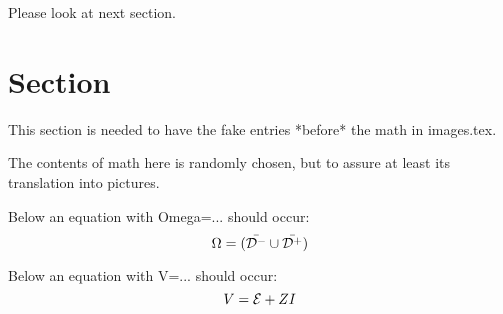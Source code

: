 \documentclass[12pt]{article}
\theoremstyle{plain}
\theoremstyle{break}
\begin{document}
Please look at next section.

\section{Section}
This section is needed to have the fake entries *before*
the math in images.tex.

The contents of math here is randomly chosen, but to assure at
least its translation into pictures.

Below an equation with Omega=... should occur:
$$\Omega=(\bar{{\cal D}^-}\cup\bar{{\cal D}^+})$$

Below an equation with V=... should occur:
$$ V={\cal E}+ZI $$
\end{document}

